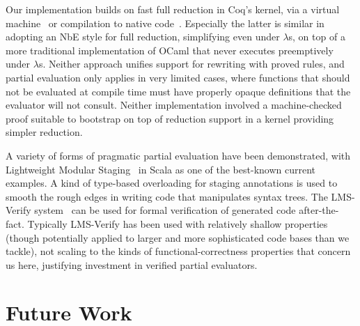 Our implementation builds on fast full reduction in Coq's kernel, via a virtual machine~\cite{vmcompute} or compilation to native code~\cite{nativecompute}.
Especially the latter is similar in adopting an NbE style for full reduction, simplifying even under $\lambda$s, on top of a more traditional implementation of OCaml that never executes preemptively under $\lambda$s.
Neither approach unifies support for rewriting with proved rules, and partial evaluation only applies in very limited cases, where functions that should not be evaluated at compile time must have properly opaque definitions that the evaluator will not consult.
Neither implementation involved a machine-checked proof suitable to bootstrap on top of reduction support in a kernel providing simpler reduction.


A variety of forms of pragmatic partial evaluation have been demonstrated, with Lightweight Modular Staging~\cite{LMS} in Scala as one of the best-known current examples.
A kind of type-based overloading for staging annotations is used to smooth the rough edges in writing code that manipulates syntax trees.
The LMS-Verify system~\cite{LMSVerify} can be used for formal verification of generated code after-the-fact.
Typically LMS-Verify has been used with relatively shallow properties (though potentially applied to larger and more sophisticated code bases than we tackle), not scaling to the kinds of functional-correctness properties that concern us here, justifying investment in verified partial evaluators.

\section{Future Work}

